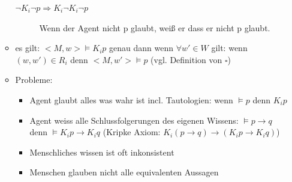 \documentclass{article} %
\begin{document}
\begin{itemize}
\begin{itemize}
\begin{description}
				\item[$\neg K_{i}\neg p \Rightarrow K_{i}\neg K_{i}\neg p$] Wenn der Agent nicht p glaubt, weiß er dass er nicht p glaubt.
			\end{description}
			\item es gilt: $<M,w> \vDash K_i p$ genau dann wenn $\forall w' \in W$ gilt: wenn $(w,w') \in R_i$ denn $<M,w'> \vDash p$ (vgl. Definition von $\square$)
			\item Probleme:
			\begin{itemize}
				\item Agent glaubt alles was wahr ist incl. Tautologien: wenn $\vDash p$ denn $K_i p$
				\item Agent weiss alle Schlussfolgerungen des eigenen Wissens: $\vDash p \rightarrow q$ denn $\vDash K_i p \rightarrow K_i q$ (Kripke Axiom: $K_i(p\rightarrow q) \rightarrow (K_i p \rightarrow K_i q)$)
				\item Menschliches wissen ist oft inkonsistent
				\item Menschen glauben nicht alle equivalenten Aussagen
			\end{itemize}
		\end{itemize}
	\end{itemize}
\end{document}
